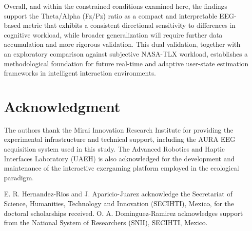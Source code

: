 \documentclass[conference]{IEEEtran}
\begin{document}
Overall, and within the constrained conditions examined here, the findings support the Theta/Alpha (Fz/Pz) ratio as a compact and interpretable EEG-based metric that exhibits a consistent directional sensitivity to differences in cognitive workload, while broader generalization will require further data accumulation and more rigorous validation. This dual validation, together with an exploratory comparison against subjective NASA-TLX workload, establishes a methodological foundation for future real-time and adaptive user-state estimation frameworks in intelligent interaction environments.



\section*{Acknowledgment}
The authors thank the Mirai Innovation Research Institute for providing the experimental infrastructure and technical support, including the AURA EEG acquisition system used in this study. The Advanced Robotics and Haptic Interfaces Laboratory (UAEH) is also acknowledged for the development and maintenance of the interactive exergaming platform employed in the ecological paradigm.

E. R. Hernandez-Rios and J. Aparicio-Juarez acknowledge the Secretariat of Science, Humanities, Technology and Innovation (SECIHTI), Mexico, for the doctoral scholarships received. O. A. Dominguez-Ramirez acknowledges support from the National System of Researchers (SNII), SECIHTI, Mexico.
\end{document}

